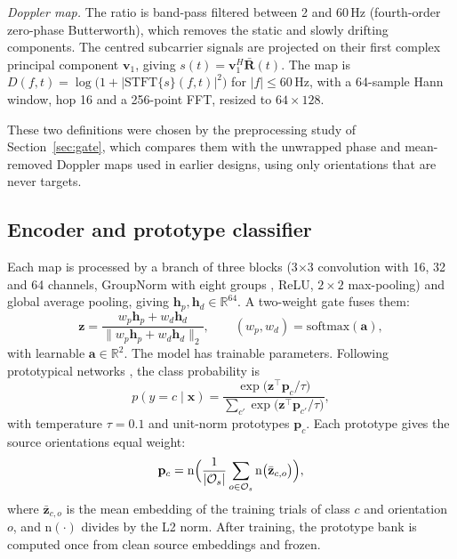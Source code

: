 \documentclass[conference]{IEEEtran}
\begin{document}
\textit{Doppler map.} The ratio is band-pass filtered between 2 and 60\,Hz (fourth-order zero-phase Butterworth), which removes the static and slowly drifting components. The centred subcarrier signals are projected on their first complex principal component $\mathbf{v}_1$, giving $s(t)=\mathbf{v}_1^{H}\bar{\mathbf{R}}(t)$. The map is $D(f,t)=\log\bigl(1+|\mathrm{STFT}\{s\}(f,t)|^2\bigr)$ for $|f|\le60$\,Hz, with a 64-sample Hann window, hop 16 and a 256-point FFT, resized to $64\times128$.

These two definitions were chosen by the preprocessing study of Section~\ref{sec:gate}, which compares them with the unwrapped phase and mean-removed Doppler maps used in earlier designs, using only orientations that are never targets.

\subsection{Encoder and prototype classifier}
Each map is processed by a branch of three blocks (3$\times$3 convolution with 16, 32 and 64 channels, GroupNorm with eight groups \cite{wu2018groupnorm}, ReLU, $2\times2$ max-pooling) and global average pooling, giving $\mathbf{h}_p,\mathbf{h}_d\in\mathbb{R}^{64}$. A two-weight gate fuses them:
\begin{equation}
\mathbf{z}=\frac{w_p\mathbf{h}_p+w_d\mathbf{h}_d}{\lVert w_p\mathbf{h}_p+w_d\mathbf{h}_d\rVert_2},\qquad (w_p,w_d)=\mathrm{softmax}(\mathbf{a}),
\end{equation}
with learnable $\mathbf{a}\in\mathbb{R}^2$. The model has \CfiveParams{} trainable parameters. Following prototypical networks \cite{snell2017protonet}, the class probability is
\begin{equation}
p(y=c\mid\mathbf{x})=\frac{\exp\bigl(\mathbf{z}^{\top}\mathbf{p}_c/\tau\bigr)}{\sum_{c'}\exp\bigl(\mathbf{z}^{\top}\mathbf{p}_{c'}/\tau\bigr)},
\end{equation}
with temperature $\tau=0.1$ and unit-norm prototypes $\mathbf{p}_c$. Each prototype gives the source orientations equal weight:
\begin{equation}
\mathbf{p}_c=\mathrm{n}\Bigl(\frac{1}{|\mathcal{O}_s|}\sum_{o\in\mathcal{O}_s}\mathrm{n}\bigl(\bar{\mathbf{z}}_{c,o}\bigr)\Bigr),
\end{equation}
where $\bar{\mathbf{z}}_{c,o}$ is the mean embedding of the training trials of class $c$ and orientation $o$, and $\mathrm{n}(\cdot)$ divides by the L2 norm. After training, the prototype bank is computed once from clean source embeddings and frozen.
\end{document}
